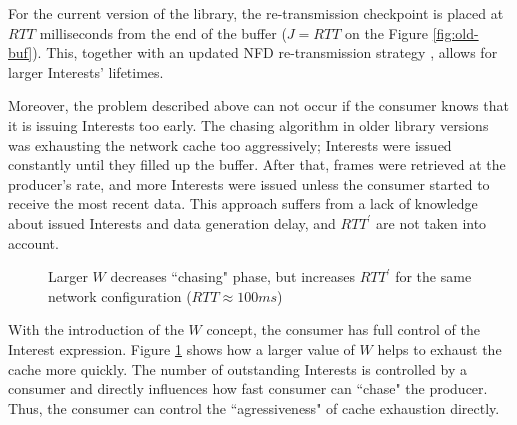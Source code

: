 \documentclass{icn/sig-alternate-2012} %
\begin{document}
For the current version of the library, the re-transmission checkpoint is placed at $RTT$ milliseconds from the end of the buffer ($J=RTT$ on the Figure \ref{fig:old-buf}). This, together with an updated NFD re-transmission strategy \cite{nfd-rtx-release}, allows for larger Interests' lifetimes.

Moreover, the problem described above can not occur if the consumer knows that it is issuing Interests too early. The chasing algorithm in older library versions was exhausting the network cache too aggressively; Interests were issued constantly until they filled up the buffer. After that, frames were retrieved at the producer's rate, and more Interests were issued unless the consumer started to receive the most recent data. This approach suffers from a lack of knowledge about issued Interests and data generation delay, and $RTT^\prime$ are not taken into account.


\begin{figure}[t!]
\centering
\begin{scriptsize}
\end{scriptsize}
\caption{Larger $W$ decreases ``chasing" phase, but increases $RTT^\prime$ for the same network configuration ($RTT\approx100ms$)}
\label{fig:ws}
\end{figure}

With the introduction of the $W$ concept, the consumer has full control of the Interest expression. Figure \ref{fig:ws} shows how a larger value of $W$ helps to exhaust the cache more quickly. The number of outstanding Interests is controlled by a consumer and directly influences how fast consumer can ``chase" the producer. Thus, the consumer can control the ``agressiveness" of cache exhaustion directly.
\end{document}
